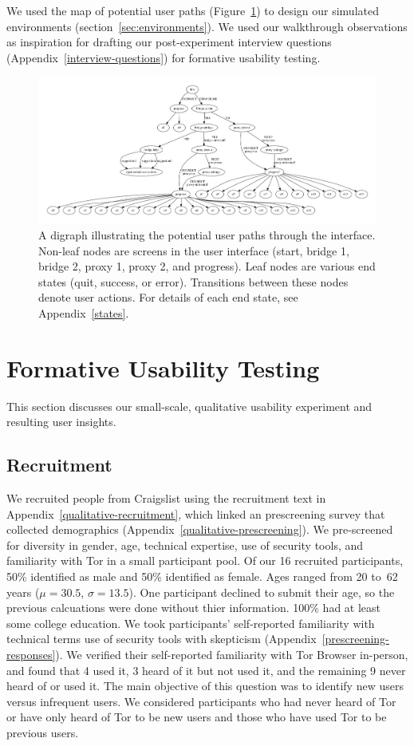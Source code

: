 \documentclass[USenglish,oneside,twocolumn]{article}
\begin{document}
We used the map of potential user paths (Figure~\ref{fig:digraph}) to design our simulated environments (section~\ref{sec:environments}).  We used our walkthrough observations as inspiration for drafting our post-experiment interview questions (Appendix~\ref{interview-questions}) for formative usability testing. 

\begin{figure}
\centering
\includegraphics[width=\textwidth]{torconfig.pdf}
\caption{
A digraph illustrating the potential user paths through the interface. Non-leaf nodes are screens in the user interface (start, bridge 1, bridge 2, proxy 1, proxy 2, and progress). Leaf nodes are various end states (quit, success, or error). Transitions between these nodes denote user actions. For details of each end state, see Appendix~\ref{states}. 
}
\label{fig:digraph}
\end{figure} 

\section{Formative Usability Testing}
\label{sec:qualitative}
This section discusses our small-scale, qualitative usability experiment and resulting user insights. 

\subsection{Recruitment}
We recruited people from Craigslist using the recruitment text in Appendix~\ref{qualitative-recruitment}, which linked an prescreening survey that collected demographics (Appendix~\ref{qualitative-prescreening}). We pre-screened~\cite{screening} for diversity in gender, age, technical expertise, use of security tools, and familiarity with Tor in a small participant pool. Of our 16 recruited participants, 50\% identified as male and 50\% identified as female. Ages ranged from 20 to~62 years ($\mu = 30.5$, $\sigma = 13.5$). One participant declined to submit their age, so the previous calcuations were done without thier information. 100\% had at least some college education. We took participants' self-reported familiarity with technical terms use of security tools with skepticism (Appendix~\ref{prescreening-responses}). We verified their self-reported familiarity with Tor Browser in-person, and found that 4 used it, 3 heard of it but not used it, and the remaining 9 never heard of or used it. The main objective of this question was to identify new users versus infrequent users. We considered participants who had never heard of Tor or have only heard of Tor to be new users and those who have used Tor to be previous users. 
\end{document}
